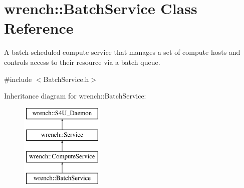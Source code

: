 \hypertarget{classwrench_1_1_batch_service}{}\section{wrench\+:\+:Batch\+Service Class Reference}
\label{classwrench_1_1_batch_service}


A batch-\/scheduled compute service that manages a set of compute hosts and controls access to their resource via a batch queue.  




{\ttfamily \#include $<$Batch\+Service.\+h$>$}

Inheritance diagram for wrench\+:\+:Batch\+Service\+:\begin{figure}[H]
\begin{center}
\leavevmode
\includegraphics[height=4.000000cm]{classwrench_1_1_batch_service}
\end{center}
\end{figure}
